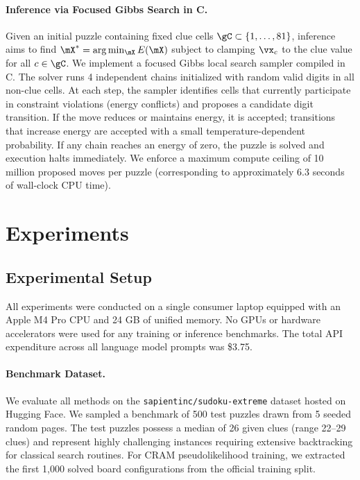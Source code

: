 \documentclass{article} %
\begin{document}
\paragraph{Inference via Focused Gibbs Search in C.}
Given an initial puzzle containing fixed clue cells $\gC \subset \{1, \dots, 81\}$, inference aims to find $\mX^* = \arg\min_{\mX} E(\mX)$ subject to clamping $\vx_c$ to the clue value for all $c \in \gC$. We implement a focused Gibbs local search sampler compiled in C. The solver runs 4 independent chains initialized with random valid digits in all non-clue cells. At each step, the sampler identifies cells that currently participate in constraint violations (energy conflicts) and proposes a candidate digit transition. If the move reduces or maintains energy, it is accepted; transitions that increase energy are accepted with a small temperature-dependent probability. If any chain reaches an energy of zero, the puzzle is solved and execution halts immediately. We enforce a maximum compute ceiling of 10 million proposed moves per puzzle (corresponding to approximately $6.3$ seconds of wall-clock CPU time).

\section{Experiments}
\label{sec:experiments}

\subsection{Experimental Setup}
\label{sec:exp_setup}
All experiments were conducted on a single consumer laptop equipped with an Apple M4 Pro CPU and 24 GB of unified memory. No GPUs or hardware accelerators were used for any training or inference benchmarks. The total API expenditure across all language model prompts was \$3.75.

\paragraph{Benchmark Dataset.}
We evaluate all methods on the \texttt{sapientinc/sudoku-extreme} dataset hosted on Hugging Face. We sampled a benchmark of 500 test puzzles drawn from 5 seeded random pages. The test puzzles possess a median of 26 given clues (range 22--29 clues) and represent highly challenging instances requiring extensive backtracking for classical search routines. For CRAM pseudolikelihood training, we extracted the first 1,000 solved board configurations from the official training split.
\end{document}
